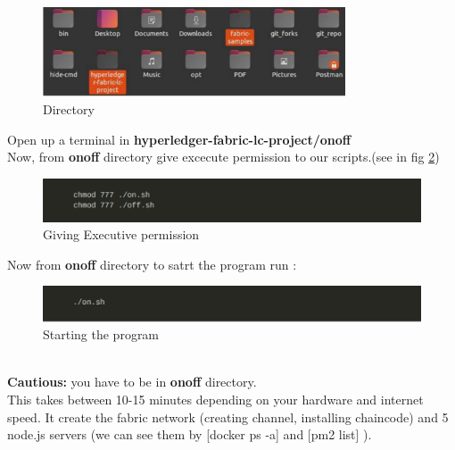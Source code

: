 \documentclass[a4paper,12pt]{report}
\begin{document}
\begin{figure}[h]
    \centering
    \includegraphics[width=0.8\textwidth]{directoryCapture.pdf}
    \caption{Directory}
    \label{fig:directory}
\end{figure}

Open up a terminal in \textbf{hyperledger-fabric-lc-project/onoff} \\
Now, from \textbf{onoff} directory give excecute permission to our scripts.(see in fig \ref{fig:chmod})

\begin{figure}[h]
    \centering
    \includegraphics[width=0.7\paperwidth]{chmodCapture.pdf}
    \caption{Giving Executive permission}
    \label{fig:chmod}
\end{figure}


Now from \textbf{onoff} directory to satrt the program run :
\begin{figure}[h]
    \centering
    \includegraphics[width=0.7\paperwidth]{onCapture.pdf}
    \caption{Starting the program}
    \label{fig:on}
\end{figure}
\\\textbf{Cautious:} you have to be in \textbf{onoff} directory.\\


\vspace{5pt} 
This takes between 10-15 minutes depending on your hardware and internet speed. It create the fabric network (creating channel, installing chaincode) and 5 node.js servers (we can see them by [docker ps -a] and [pm2 list] ).\\
\end{document}
